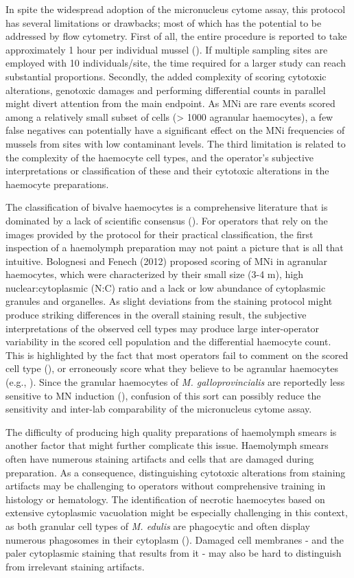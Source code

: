 In spite the widespread adoption of the micronucleus cytome assay, this protocol has several limitations or drawbacks; most of which has the potential to be addressed by flow cytometry. First of all, the entire procedure is reported to take approximately 1 hour per individual mussel (\cite{Bolognesi2012}). If multiple sampling sites are employed with 10 individuals/site, the time required for a larger study can reach substantial proportions. Secondly, the added complexity of scoring cytotoxic alterations, genotoxic damages and performing differential counts in parallel might divert attention from the main endpoint. As MNi are rare events scored among a relatively small subset of cells (> 1000 agranular haemocytes), a few false negatives can potentially have a significant effect on the MNi frequencies of mussels from sites with low contaminant levels. The third limitation is related to the complexity of the haemocyte cell types, and the operator's subjective interpretations or classification of these and their cytotoxic alterations in the haemocyte preparations. 

The classification of bivalve haemocytes is a comprehensive literature that is dominated by a lack of scientific consensus (\cite{Hine1999}). For operators that rely on the images provided by the protocol for their practical classification, the first inspection of a haemolymph preparation may not paint a picture that is all that intuitive. Bolognesi and Fenech (2012) proposed scoring of MNi in agranular haemocytes, which were characterized by their small size (3-4 \micro m), high nuclear:cytoplasmic (N:C) ratio and a lack or low abundance of cytoplasmic granules and organelles. As slight deviations from the staining protocol might produce striking differences in the overall staining result, the subjective interpretations of the observed cell types may produce large inter-operator variability in the scored cell population and the differential haemocyte count. This is highlighted by the fact that most operators fail to comment on the scored cell type (\cite{Bolognesi2012}), or erroneously score what they believe to be agranular haemocytes (e.g., \cite{Meng2020}). Since the granular haemocytes of \emph{M. galloprovincialis} are reportedly less sensitive to MN induction (\cite{Venier1997}), confusion of this sort can possibly reduce the sensitivity and inter-lab comparability of the micronucleus cytome assay. 

The difficulty of producing high quality preparations of haemolymph smears is another factor that might further complicate this issue. Haemolymph smears often have numerous staining artifacts and cells that are damaged during preparation. As a consequence, distinguishing cytotoxic alterations from staining artifacts may be challenging to operators without comprehensive training in histology or hematology. The identification of necrotic haemocytes based on extensive cytoplasmic vacuolation might be especially challenging in this context, as both granular cell types of \emph{M. edulis} are phagocytic and often display numerous phagosomes in their cytoplasm (\cite{Moore1977}). Damaged cell membranes - and the paler cytoplasmic staining that results from it - may also be hard to distinguish from irrelevant staining artifacts. 

